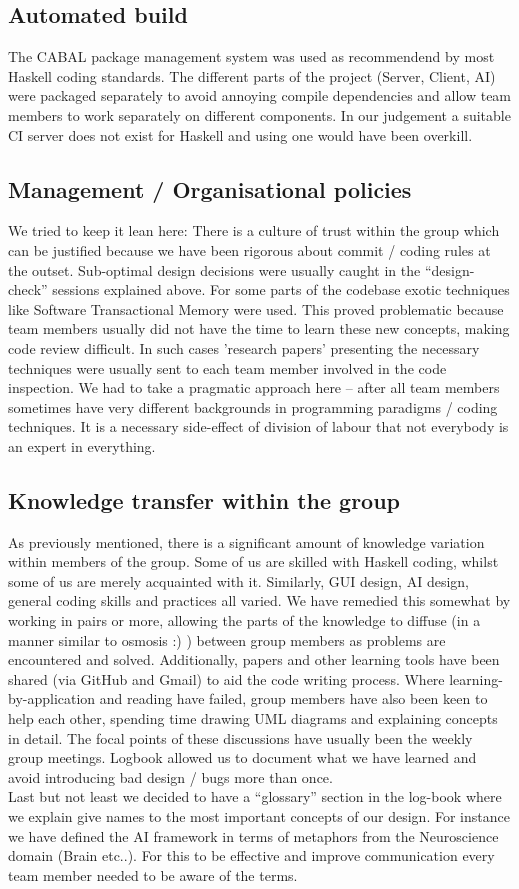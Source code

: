 \documentclass[pdftex,12pt,a4paper]{report}
\begin{document}
\subsection{Automated build}
The CABAL package management system was used as recommendend by most
Haskell coding standards. The different parts of the project (Server,
Client, AI) were packaged separately to avoid annoying compile
dependencies and allow team members to work separately on different
components. In our judgement a suitable CI server does not exist for
Haskell and using one would have been overkill.

\subsection{Management / Organisational policies}
We tried to keep it lean here: There is a culture of trust within the
group which can be justified because we have been rigorous about
commit / coding rules at the outset. Sub-optimal design decisions were
usually caught in the ``design-check'' sessions explained above. For
some parts of the codebase exotic techniques like Software
Transactional Memory were used. This proved problematic because team
members usually did not have the time to learn these new concepts,
making code review difficult. In such cases 'research papers'
presenting the necessary techniques were usually sent to each team
member involved in the code inspection. We had to take a pragmatic
approach here -- after all team members sometimes have very different
backgrounds in programming paradigms / coding techniques. It is a
necessary side-effect of division of labour that not everybody is an
expert in everything.

\subsection{Knowledge transfer within the group}
As previously mentioned, there is a significant amount of knowledge
variation within members of the group. Some of us are skilled with
Haskell coding, whilst some of us are merely acquainted with
it. Similarly, GUI design, AI design, general coding skills and
practices all varied. We have remedied this somewhat by working in
pairs or more, allowing the parts of the knowledge to diffuse (in a
manner similar to osmosis :) ) between group members as problems are
encountered and solved. Additionally, papers and other learning tools
have been shared (via GitHub and Gmail) to aid the code writing
process. Where learning-by-application and reading have failed, group
members have also been keen to help each other, spending time drawing
UML diagrams and explaining concepts in detail. The focal points of
these discussions have usually been the weekly group meetings. Logbook
allowed us to document what we have learned and avoid introducing bad
design / bugs more than once.  \\ Last but not least we decided to
have a ``glossary'' section in the log-book where we explain give
names to the most important concepts of our design. For instance we
have defined the AI framework in terms of metaphors from the
Neuroscience domain (Brain etc..). For this to be effective and
improve communication every team member needed to be aware of the
terms.
\end{document}
